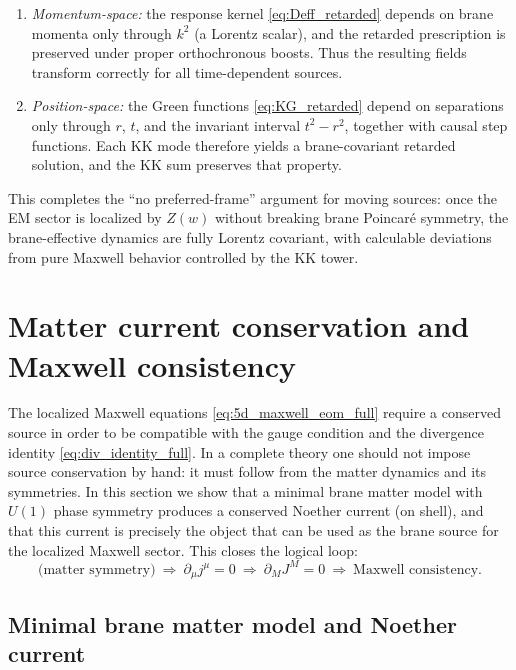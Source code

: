 \documentclass[11pt]{article}
\newcommand{\Z}{Z}
\begin{document}
\begin{enumerate}
\item \emph{Momentum-space:} the response kernel \cref{eq:Deff_retarded} depends on
brane momenta only through \(k^2\) (a Lorentz scalar), and the retarded
prescription is preserved under proper orthochronous boosts. Thus the resulting
fields transform correctly for all time-dependent sources.

\item \emph{Position-space:} the Green functions \cref{eq:KG_retarded} depend on
separations only through \(r\), \(t\), and the invariant interval
\(t^2-r^2\), together with causal step functions. Each KK mode therefore yields a
brane-covariant retarded solution, and the KK sum preserves that property.
\end{enumerate}

This completes the ``no preferred-frame'' argument for moving sources: once the
EM sector is localized by \(\Z(w)\) without breaking brane Poincar\'e symmetry, the
brane-effective dynamics are fully Lorentz covariant, with calculable deviations
from pure Maxwell behavior controlled by the KK tower.

\section{Matter current conservation and Maxwell consistency}
\label{sec:matter_current}

The localized Maxwell equations \cref{eq:5d_maxwell_eom_full} require a conserved
source in order to be compatible with the gauge condition and the divergence
identity \cref{eq:div_identity_full}. In a complete theory one should not impose
source conservation by hand: it must follow from the matter dynamics and its
symmetries. In this section we show that a minimal brane matter model with
\(U(1)\) phase symmetry produces a conserved Noether current (on shell), and that
this current is precisely the object that can be used as the brane source for the
localized Maxwell sector. This closes the logical loop:
\[
\text{(matter symmetry)} \ \Rightarrow\ \partial_\mu j^\mu=0
\ \Rightarrow\ \partial_M J^M=0
\ \Rightarrow\ \text{Maxwell consistency}.
\]

\subsection{Minimal brane matter model and Noether current}
\label{sec:noether_current}
\end{document}
